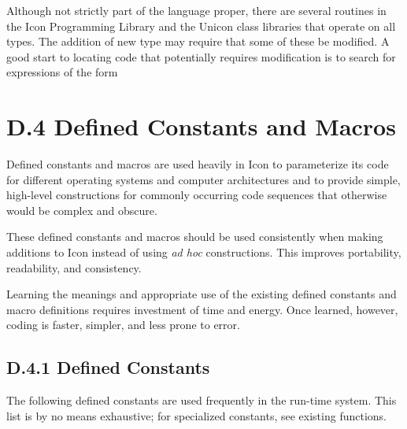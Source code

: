 Although not strictly part of the language proper, there are several
routines in the Icon Programming Library and the Unicon class libraries
that operate on all types. The addition of new type may require that some
of these be modified. A good start to locating code that potentially
requires modification is to search for expressions of the form

\section[D.4 Defined Constants and Macros]{D.4 Defined Constants and Macros}

Defined constants and macros are used heavily in Icon to parameterize
its code for different operating systems and computer architectures
and to provide simple, high-level constructions for commonly occurring
code sequences that otherwise would be complex and obscure.

These defined constants and macros should be used consistently when
making additions to Icon instead of using \textit{ad hoc}
constructions. This improves portability, readability, and
consistency.

Learning the meanings and appropriate use of the existing defined
constants and macro definitions requires investment of time and
energy. Once learned, however, coding is faster, simpler, and less
prone to error.

\subsection[D.4.1 Defined Constants]{D.4.1 Defined Constants}

The following defined constants are used frequently in the run-time
system. This list is by no means exhaustive; for specialized
constants, see existing functions.\\[1ex]

